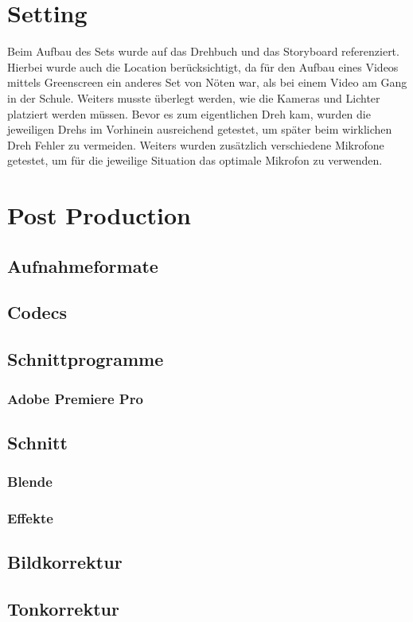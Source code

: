 \section{Setting}
Beim Aufbau des Sets wurde auf das Drehbuch und das Storyboard referenziert. Hierbei wurde auch die Location berücksichtigt, da für  den Aufbau eines Videos mittels Greenscreen ein anderes Set von Nöten war, als bei einem Video am Gang in der Schule. Weiters musste überlegt werden, wie die Kameras und Lichter platziert werden müssen. Bevor es zum eigentlichen Dreh kam, wurden die jeweiligen Drehs im Vorhinein ausreichend getestet, um später beim wirklichen Dreh Fehler zu vermeiden. Weiters wurden zusätzlich verschiedene Mikrofone getestet, um für die jeweilige Situation das optimale Mikrofon zu verwenden.
\section{Post Production}
\subsection{Aufnahmeformate}
\subsection{Codecs}
\subsection{Schnittprogramme}
\subsubsection{Adobe Premiere Pro}
\subsection{Schnitt}
\subsubsection{Blende}
\subsubsection{Effekte}
\subsection{Bildkorrektur}
\subsection{Tonkorrektur}


